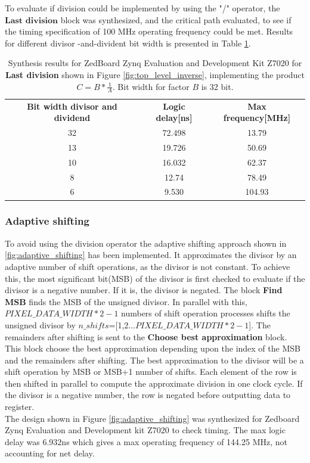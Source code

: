 To evaluate if division could be implemented by using the "/" operator, the $\textbf{Last division}$ block was synthesized, and the critical path evaluated, to see if the timing specification of 100 MHz operating frequency could be met. Results for different divisor -and-divident bit width is presented in Table \ref{tab:division_operator_logic_delays}. 


\begin{table}[H]
    \centering
    \begin{tabular}{c|c|c}
    \textbf{Bit width divisor and dividend} &\textbf{Logic delay[ns]}&\textbf{Max frequency[MHz] } \\
         32&72.498 &13.79 \\
         13 &19.726 &50.69\\
         10 & 16.032&62.37 \\
         8 & 12.74&78.49 \\
         6&9.530& 104.93\\
         
    \end{tabular}
    \caption{Synthesis results for ZedBoard Zynq Evaluation and Development Kit Z7020 for \textbf{Last division} shown in Figure \ref{fig:top_level_inverse}, implementing the product $C= B*\frac{1}{A}$. Bit width for factor $B$ is 32 bit.}
    \label{tab:division_operator_logic_delays}
\end{table}{}

\subsubsection{Adaptive shifting}
\label{sec:adaptive_shifting}
        To avoid using the division operator the adaptive shifting approach shown in \ref{fig:adaptive_shifting} has been implemented. It approximates the divisor by an adaptive number of shift operations, as the divisor is not constant. To achieve this, the most significant bit(MSB) of the divisor is first checked to evaluate if the divisor is a negative number. If it is, the divisor is negated. The block \textbf{Find MSB} finds the MSB of the unsigned divisor. In parallel with this, $PIXEL\_DATA\_WIDTH*2-1$ numbers of shift operation processes shifts the unsigned divisor by $n\_shifts$=[1,2...$PIXEL\_DATA\_WIDTH*2-1$]. The remainders after shifting is sent to the \textbf{Choose best approximation} block. This block choose the best approximation depending upon the index of the MSB and the remainders after shifting. The best approximation to the divisor will be a shift operation by MSB or MSB+1 number of shifts. Each element of the row is then shifted in parallel to compute the approximate division in one clock cycle. If the divisor is a negative number, the row is negated before outputting data to register.
        \\
        The design shown in Figure \ref{fig:adaptive_shifting} was synthesized for Zedboard Zynq Evaluation and Development kit Z7020 to check timing. The max logic delay was $6.932$ns which gives a max operating frequency of 144.25 MHz, not accounting for net delay. 



